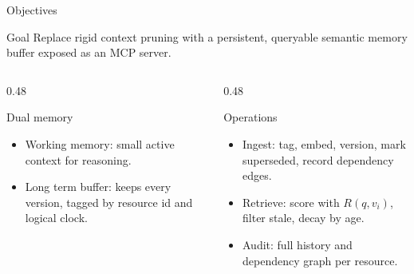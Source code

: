 \documentclass[aspectratio=169,10pt]{beamer}
\begin{document}
\begin{frame}{Objectives}
  \begin{block}{Goal}
    Replace rigid context pruning with a persistent, queryable semantic memory buffer exposed as an MCP server.
  \end{block}
  \begin{columns}[T,onlytextwidth]
    \begin{column}{0.48\textwidth}
      \begin{block}{Dual memory}
        \begin{itemize}
          \item Working memory: small active context for reasoning.
          \item Long term buffer: keeps every version, tagged by resource id and logical clock.
        \end{itemize}
      \end{block}
    \end{column}
    \begin{column}{0.48\textwidth}
      \begin{block}{Operations}
        \begin{itemize}
          \item Ingest: tag, embed, version, mark superseded, record dependency edges.
          \item Retrieve: score with $R(q,v_i)$, filter stale, decay by age.
          \item Audit: full history and dependency graph per resource.
        \end{itemize}
      \end{block}
    \end{column}
  \end{columns}
\end{frame}
\end{document}

